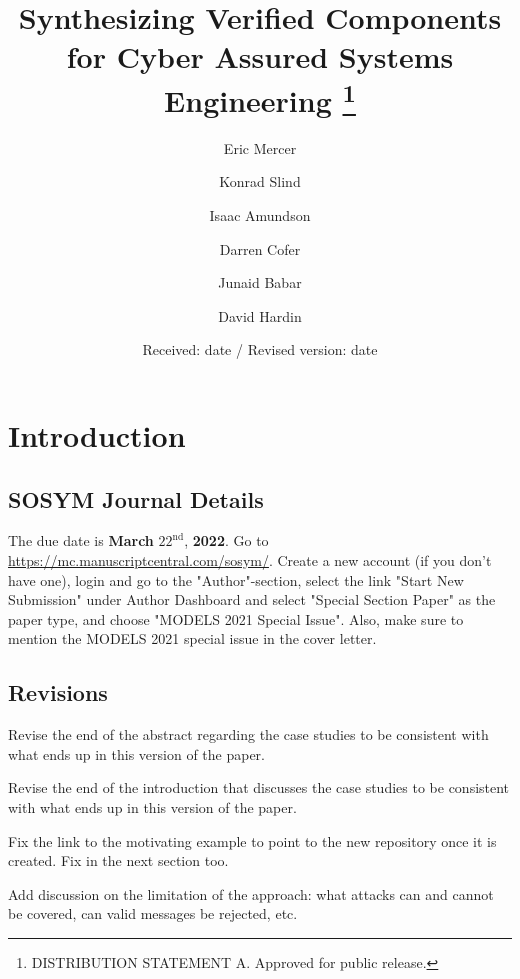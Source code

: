 \documentclass[global,twocolumn]{svjour}
\begin{document}
\title{
  Synthesizing Verified Components for Cyber Assured Systems Engineering
  \thanks{DISTRIBUTION STATEMENT A.  Approved for public release.}
}

\author{
  Eric Mercer    \and
  Konrad Slind   \and
  Isaac Amundson \and
  Darren Cofer   \and
  Junaid Babar   \and
  David Hardin
}


\date{Received: date / Revised version: date}

\maketitle

\begin{abstract}

\end{abstract}

\section{Introduction} \label{sec:intro}


\subsection{SOSYM Journal Details}
The due date is \textbf{March} $22^\mathrm{nd}$, \textbf{2022}.
Go to \url{https://mc.manuscriptcentral.com/sosym/}. Create a new account (if you don't have one), login and go to the "Author"-section, select the link "Start New Submission" under Author Dashboard and select "Special Section Paper" as the paper type, and choose "MODELS 2021 Special Issue". Also, make sure to mention the MODELS 2021 special issue in the cover letter.

\subsection{Revisions}
\begin{compactitem}
  \item Revise the end of the abstract regarding the case studies to be consistent with what ends up in this version of the paper.
  \item Revise the end of the introduction that discusses the case studies to be consistent with what ends up in this version of the paper.
  \item Fix the link to the motivating example to point to the new repository once it is created. Fix in the next section too.
  \item Add discussion on the limitation of the approach: what attacks can and cannot be covered, can valid messages be rejected, etc.
\end{compactitem}
\end{document}
